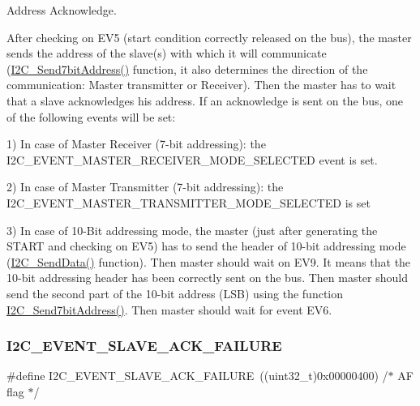 Address Acknowledge. 

After checking on E\+V5 (start condition correctly released on the bus), the master sends the address of the slave(s) with which it will communicate (\mbox{\hyperlink{group___i2_c___exported___functions_ga009fc2a5b2313c36da39ece39a1156a6}{I2\+C\+\_\+\+Send7bit\+Address()}} function, it also determines the direction of the communication\+: Master transmitter or Receiver). Then the master has to wait that a slave acknowledges his address. If an acknowledge is sent on the bus, one of the following events will be set\+:

1) In case of Master Receiver (7-\/bit addressing)\+: the I2\+C\+\_\+\+E\+V\+E\+N\+T\+\_\+\+M\+A\+S\+T\+E\+R\+\_\+\+R\+E\+C\+E\+I\+V\+E\+R\+\_\+\+M\+O\+D\+E\+\_\+\+S\+E\+L\+E\+C\+T\+ED event is set.

2) In case of Master Transmitter (7-\/bit addressing)\+: the I2\+C\+\_\+\+E\+V\+E\+N\+T\+\_\+\+M\+A\+S\+T\+E\+R\+\_\+\+T\+R\+A\+N\+S\+M\+I\+T\+T\+E\+R\+\_\+\+M\+O\+D\+E\+\_\+\+S\+E\+L\+E\+C\+T\+ED is set

3) In case of 10-\/Bit addressing mode, the master (just after generating the S\+T\+A\+RT and checking on E\+V5) has to send the header of 10-\/bit addressing mode (\mbox{\hyperlink{group___i2_c___exported___functions_ga7bd9e70b8eafde0dd5eb42b0d95fe1a9}{I2\+C\+\_\+\+Send\+Data()}} function). Then master should wait on E\+V9. It means that the 10-\/bit addressing header has been correctly sent on the bus. Then master should send the second part of the 10-\/bit address (L\+SB) using the function \mbox{\hyperlink{group___i2_c___exported___functions_ga009fc2a5b2313c36da39ece39a1156a6}{I2\+C\+\_\+\+Send7bit\+Address()}}. Then master should wait for event E\+V6. \mbox{\label{group___i2_c___events_ga249bd611f1ca64653c0bfc606c591088}} 
\subsubsection{\texorpdfstring{I2C\_EVENT\_SLAVE\_ACK\_FAILURE}{I2C\_EVENT\_SLAVE\_ACK\_FAILURE}}
{\footnotesize\ttfamily \#define I2\+C\+\_\+\+E\+V\+E\+N\+T\+\_\+\+S\+L\+A\+V\+E\+\_\+\+A\+C\+K\+\_\+\+F\+A\+I\+L\+U\+RE~((uint32\+\_\+t)0x00000400)  /$\ast$ A\+F flag $\ast$/}

\mbox{\label{group___i2_c___events_ga8b244626839940569c6c8bbfc4efe21d}} 

